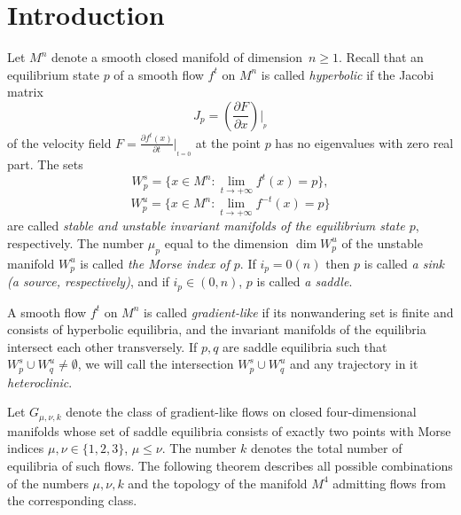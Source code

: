 \documentclass[%
 aip,
 amsmath,amssymb,
preprint,%
]{revtex4-1}
\begin{document}
\section{Introduction\label{intro}}

Let  $M^n$ denote a smooth closed manifold of dimension~$n\geq 1$. Recall that an equilibrium state $p$ of a smooth flow $f^t$ on $M^n$ is called {\it hyperbolic} if the Jacobi matrix $$J_p=(\frac{\partial F}{\partial x})|_{_p}$$ of the   velocity field $F=\frac{\partial f^t(x)}{\partial t}|_{_{t=0}}$ at the point $p$ has no eigenvalues with zero real part. The sets $$W^s_p=\{x\in M^n: \lim\limits_{t\to +\infty} f^{t}(x)= p\},$$ $$W^u_p=\{x\in M^n: \lim\limits_{t\to +\infty} f^{-t}(x)= p\}$$ are called {\it stable and unstable invariant manifolds of the equilibrium state $p$}, respectively. The number $\mu_p$ equal to the dimension $\dim W^u_{p}$ of the unstable manifold $W^u_p$ is called {\it the  Morse index of $p$}. If  $i_p=0(n)$ then $p$ is called {\it a sink (a source, respectively)}, and  if $i_p\in (0,n)$, $p$ is called {\it a saddle}. 

A smooth flow $f^t$ on $M^n$ is called {\it gradient-like} if its nonwandering set is finite and consists of hyperbolic equilibria, and the invariant manifolds of the equilibria intersect each other  transversely. If $p,q$ are saddle equilibria such that $W^s_p\cup W^u_q\neq \emptyset$, we will call the intersection $W^s_p\cup W^u_q$ and any trajectory in it  {\it heteroclinic}.  

Let $G_{\mu,\nu,k}$ denote the class of gradient-like flows on closed four-dimensional manifolds whose set of saddle equilibria consists of exactly two points with Morse indices $\mu, \nu\in \{1,2,3\}$, $\mu\leq \nu$. The number $k$ denotes the total number of equilibria of such flows. The following theorem describes all possible combinations of the numbers $\mu, \nu, k$ and the topology of the manifold $M^4$ admitting flows from the corresponding class.
\end{document}
